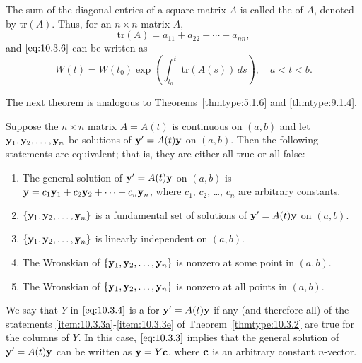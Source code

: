 \documentclass{ximera}
\begin{document}
\begin{remark}
The sum of the diagonal entries of a square matrix $A$ is called the
 of $A$, denoted by tr$(A)$. Thus, for an $n\times n$
matrix $A$,
$$
\mbox{tr}(A)=a_{11}+a_{22}+\cdots+a_{nn},
$$
and  $\eqref{eq:10.3.6}$ can be written as
$$
W(t)=W(t_0)\exp\left(
\int^t_{t_0}\mbox{tr}(A(s))\,
ds\right), \quad a < t < b.
$$
\end{remark}

The next theorem is analogous to
Theorems~\ref{thmtype:5.1.6} and
\ref{thmtype:9.1.4}.

\begin{theorem}\label{thmtype:10.3.3}
Suppose the  $n\times n$ matrix $A=A(t)$ is continuous
 on $(a,b)$ and let
${\bf y}_1, {\bf y}_2, \dots,{\bf y}_n$
be  solutions of ${\bf y}'=A(t){\bf y}$ on  $(a,b)$.
 Then the following statements are equivalent; that is, they are
either all true or all false:
\begin{enumerate}
\item\label{item:10.3.3a} %
The general solution of ${\bf y}'=A(t){\bf y}$ on  $(a,b)$ is
${\bf y}=c_1{\bf y}_1+c_2{\bf y}_2+\cdots+c_n{\bf y}_n$,
where $c_1$, $c_2$, \dots, $c_n$  are arbitrary constants.
\item\label{item:10.3.3b} %
  $\{{\bf y}_1,{\bf y}_2,\dots,{\bf y}_n\}$ is a fundamental
set of solutions of ${\bf y}'=A(t){\bf y}$  on $(a,b)$.
\item\label{item:10.3.3c} %
 $\{{\bf y}_1,{\bf y}_2,\dots,{\bf y}_n\}$ is linearly
independent on $(a,b)$.
\item\label{item:10.3.3d} %
The Wronskian of  $\{{\bf y}_1,{\bf y}_2,\dots,{\bf y}_n\}$ is nonzero
at some point in $(a,b)$.
\item\label{item:10.3.3e} %
The Wronskian of  $\{{\bf y}_1,{\bf y}_2,\dots,{\bf y}_n\}$ is nonzero
at all points in $(a,b)$.
\end{enumerate}
\end{theorem}


We say that $Y$ in $\eqref{eq:10.3.4}$ is a  for
${\bf y}'=A(t){\bf y}$ if any (and therefore all) of the statements
\ref{item:10.3.3a}-\ref{item:10.3.3e} of Theorem~\ref{thmtype:10.3.2} are true for the
columns of $Y$. In this case, $\eqref{eq:10.3.3}$ implies that the general
solution of ${\bf y}'=A(t){\bf y}$ can be written as ${\bf y}=Y{\bf
c}$, where ${\bf c}$ is an arbitrary constant $n$-vector.
\end{document}
